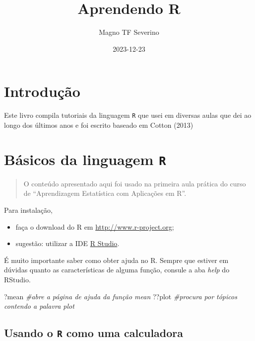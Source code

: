 \documentclass[
]{book}
\title{Aprendendo R}
\author{Magno TF Severino}
\date{2023-12-23}
\newenvironment{Shaded}{\begin{snugshade}}{\end{snugshade}}
\newcommand{\CommentTok}[1]{\textcolor[rgb]{0.56,0.35,0.01}{\textit{#1}}}
\newcommand{\NormalTok}[1]{#1}
\begin{document}
\maketitle

{
\setcounter{tocdepth}{1}
\tableofcontents
}
\chapter*{Introdução}\label{introduuxe7uxe3o}

Este livro compila tutoriais da linguagem \texttt{R} que usei em diversas aulas que dei ao longo dos últimos anos e foi escrito baseado em Cotton (2013)

\chapter{\texorpdfstring{Básicos da linguagem \texttt{R}}{Básicos da linguagem R}}\label{buxe1sicos-da-linguagem-r}

\begin{quote}
O conteúdo apresentado aqui foi usado na primeira aula prática do curso de ``Aprendizagem Estatística com Aplicações em R''.
\end{quote}

Para instalação,

\begin{itemize}
\item
  faça o download do R em \url{http://www.r-project.org};
\item
  sugestão: utilizar a IDE \href{http://www.rstudio.org}{R Studio}.
\end{itemize}

É muito importante saber como obter ajuda no R.
Sempre que estiver em dúvidas quanto as características de alguma função, consule a aba \emph{help} do RStudio.

\begin{Shaded}
\begin{Highlighting}[]
\NormalTok{?mean }\CommentTok{\#abre a página de ajuda da função \textquotesingle{}mean\textquotesingle{}}
\NormalTok{??plot }\CommentTok{\#procura por tópicos contendo a palavra \textquotesingle{}plot\textquotesingle{}}
\end{Highlighting}
\end{Shaded}

\section{\texorpdfstring{Usando o \texttt{R} como uma calculadora}{Usando o R como uma calculadora}}\label{usando-o-r-como-uma-calculadora}
\end{document}
